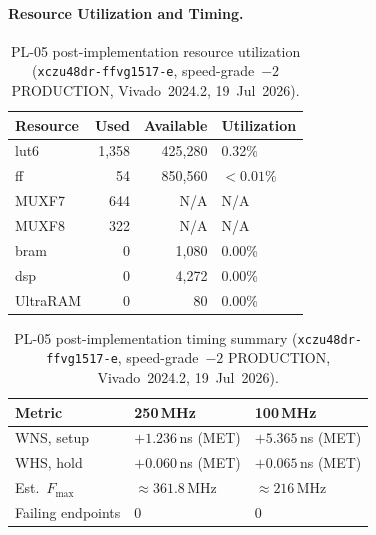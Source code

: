 \paragraph{Resource Utilization and Timing.}
\leavevmode\par
\begin{table}[!h]
  \caption{PL-05 post-implementation resource utilization
           (\texttt{xczu48dr\allowbreak-ffvg1517\allowbreak-e}, speed-grade~$-2$
           PRODUCTION, Vivado~2024.2, 19~Jul~2026).}
  \label{tab:pl05_resources}
  \centering
  \begin{tabular}{lrrl}
    \hline
    Resource  & Used    & Available  & Utilization \\
    \hline
    \ac{lut6} & 1{,}358 & 425{,}280  & 0.32\%      \\[2pt]
    \ac{ff}   &      54 & 850{,}560  & $<0.01$\%   \\[2pt]
    MUXF7     &     644 & N/A        & N/A          \\[2pt]
    MUXF8     &     322 & N/A        & N/A          \\[2pt]
    \ac{bram} &       0 & 1{,}080    & 0.00\%       \\[2pt]
    \ac{dsp}  &       0 & 4{,}272    & 0.00\%       \\[2pt]
    UltraRAM  &       0 & 80         & 0.00\%       \\
    \hline
  \end{tabular}
\end{table}

\vspace{-30pt}
\leavevmode\par
\begin{table}[!h]
  \caption{PL-05 post-implementation timing summary
           (\texttt{xczu48dr\allowbreak-ffvg1517\allowbreak-e}, speed-grade~$-2$
           PRODUCTION, Vivado~2024.2, 19~Jul~2026).}
  \label{tab:pl05_timing}
  \centering
  \begin{tabular}{lll}
    \hline
    Metric             & 250\,MHz             & 100\,MHz            \\
    \hline
    WNS, setup         & $+1.236$\,ns (MET)   & $+5.365$\,ns (MET)  \\[2pt]
    WHS, hold          & $+0.060$\,ns (MET)   & $+0.065$\,ns (MET)  \\[2pt]
    Est.\ $F_{\max}$   & $\approx 361.8$\,MHz & $\approx 216$\,MHz   \\[2pt]
    Failing endpoints  & 0                    & 0                   \\
    \hline
  \end{tabular}
\end{table}
\FloatBarrier

